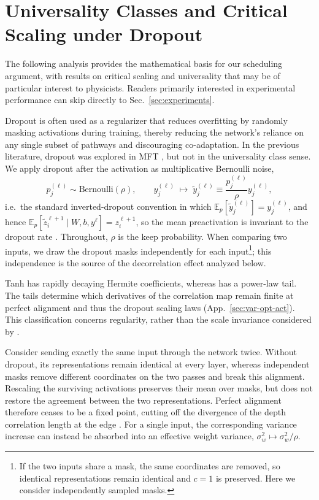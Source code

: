\section{Universality Classes and Critical Scaling under Dropout}

The following analysis provides the mathematical basis for our scheduling argument, with results on critical scaling and universality that may be of particular interest to physicists. Readers primarily interested in experimental performance can skip directly to Sec.~\ref{sec:experiments}.

Dropout \cite{srivastava2014dropout,wager2013dropout} is often used as a regularizer that reduces overfitting by randomly masking activations during training, thereby reducing the network's reliance on any single subset of pathways and discouraging co-adaptation. In the previous literature, dropout was explored in MFT \cite{lee2019mean, schoenholz2017deepinformationpropagation}, but not in the universality class sense. We apply dropout after the activation as multiplicative Bernoulli noise,
\begin{equation}
p^{(\ell)}_{j} \sim \mathrm{Bernoulli}(\rho), \qquad y^{(\ell)}_j \;\mapsto\; \tilde y^{(\ell)}_j \equiv \frac{p^{(\ell)}_{j}}{\rho} y^{(\ell)}_j,
\end{equation}
i.e.\ the standard inverted-dropout convention in which $\mathbb E_p[\tilde y^{(\ell)}_j]=y^{(\ell)}_j$, and hence $\mathbb E_p[\tilde z^{\ell+1}_i\mid W,b,y^\ell]=z^{\ell+1}_i$, so the mean preactivation is invariant to the dropout rate \cite{schoenholz2017deepinformationpropagation}. Throughout, $\rho$ is the keep probability. When comparing two inputs, we draw the dropout masks independently for each input\footnote{If the two inputs share a mask, the same coordinates are removed, so identical representations remain identical and $c=1$ is preserved. Here we consider independently sampled masks.}; this independence is the source of the decorrelation effect analyzed below.

Tanh has rapidly decaying Hermite coefficients, whereas \relu{} has a power-law tail. The tails determine which derivatives of the correlation map remain finite at perfect alignment and thus the dropout scaling laws (App.~\ref{sec:var-opt-act}). This classification concerns regularity, rather than the scale invariance considered by \citet{roberts2022principlesdeeplearningtheory}.

Consider sending exactly the same input through the network twice. Without dropout, its representations remain identical at every layer, whereas independent masks remove different coordinates on the two passes and break this alignment. Rescaling the surviving activations preserves their mean over masks, but does not restore the agreement between the two representations. Perfect alignment therefore ceases to be a fixed point, cutting off the divergence of the depth correlation length at the edge \cite{schoenholz2017deepinformationpropagation}. For a single input, the corresponding variance increase can instead be absorbed into an effective weight variance, $\sigma_w^2\mapsto\sigma_w^2/\rho$.

